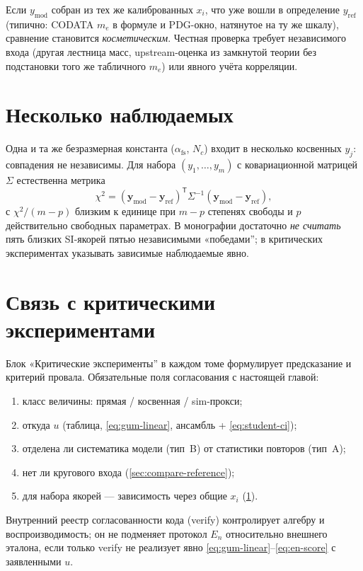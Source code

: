 \begin{remark}
Если $y_{\mathrm{mod}}$ собран из тех же калиброванных $x_i$, что уже вошли
в определение $y_{\mathrm{ref}}$ (типично: CODATA $m_e$ в формуле и PDG-окно,
натянутое на ту же шкалу), сравнение становится \emph{косметическим}.
Честная проверка требует независимого входа (другая лестница масс, upstream-оценка
из замкнутой теории без подстановки того же табличного $m_e$) или явного учёта корреляции.
\end{remark}

\section{Несколько наблюдаемых}
\label{sec:multiple-observables}

Одна и та же безразмерная константа ($\alpha_{\mathrm{fs}}$, $N_c$)
входит в несколько косвенных $y_j$: совпадения не независимы.
Для набора $(y_1,\ldots,y_m)$ с ковариационной матрицей $\Sigma$
естественна метрика
\begin{equation}
  \chi^2 = ({\mathbf y}_{\mathrm{mod}}-{\mathbf y}_{\mathrm{ref}})^{\mathsf T}
  \Sigma^{-1} ({\mathbf y}_{\mathrm{mod}}-{\mathbf y}_{\mathrm{ref}}),
\end{equation}
с $\chi^2/(m-p)$ близким к единице при $m-p$ степенях свободы и $p$ действительно свободных параметрах.
В монографии достаточно \emph{не считать} пять близких SI-якорей пятью независимыми «победами'';
в критических экспериментах указывать зависимые наблюдаемые явно.

\section{Связь с критическими экспериментами}
\label{sec:metrology-critical}

Блок «Критические эксперименты'' в каждом томе формулирует предсказание и критерий провала.
Обязательные поля согласования с настоящей главой:
\begin{enumerate}[label=\textbf{M\arabic*:},leftmargin=*]
\item класс величины: прямая / косвенная / sim-прокси;
\item откуда $u$ (таблица, \eqref{eq:gum-linear}, ансамбль + \eqref{eq:student-ci});
\item отделена ли систематика модели (тип~B) от статистики повторов (тип~A);
\item нет ли кругового входа (\cref{sec:compare-reference});
\item для набора якорей --- зависимость через общие $x_i$ (\cref{sec:multiple-observables}).
\end{enumerate}

Внутренний реестр согласованности кода (verify) контролирует алгебру и воспроизводимость;
он не подменяет протокол $E_n$ относительно внешнего эталона, если только verify
не реализует явно \eqref{eq:gum-linear}--\eqref{eq:en-score} с заявленными $u$.
